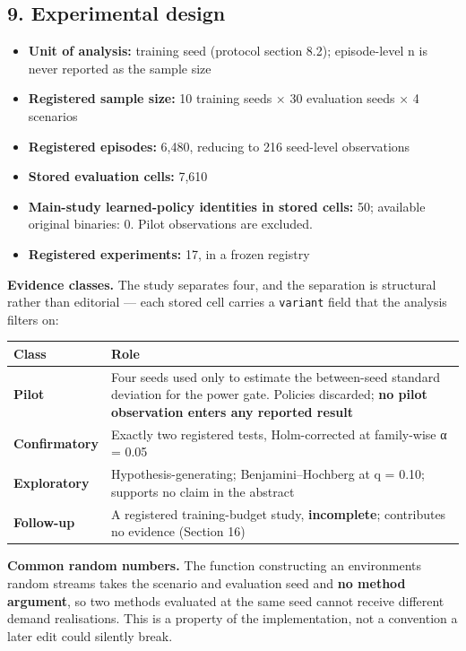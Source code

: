 \documentclass[
]{article}
\providecommand{\tightlist}{%
  \setlength{\itemsep}{0pt}\setlength{\parskip}{0pt}}
\begin{document}
\subsection{9. Experimental design}\label{9-experimental-design}

\begin{itemize}
\tightlist
\item
  \textbf{Unit of analysis:} training seed (protocol section 8.2);
  episode-level n is never reported as the sample size
\item
  \textbf{Registered sample size:} 10 training seeds × 30 evaluation
  seeds × 4 scenarios
\item
  \textbf{Registered episodes:} 6,480, reducing to 216 seed-level
  observations
\item
  \textbf{Stored evaluation cells:} 7,610
\item
  \textbf{Main-study learned-policy identities in stored cells:} 50;
  available original binaries: 0. Pilot observations are excluded.
\item
  \textbf{Registered experiments:} 17, in a frozen registry
\end{itemize}

\textbf{Evidence classes.} The study separates four, and the separation
is structural rather than editorial --- each stored cell carries a
\texttt{variant} field that the analysis filters on:

\begin{longtable}[]{@{}ll@{}}
\toprule\noalign{}
Class & Role \\
\midrule\noalign{}
\endhead
\bottomrule\noalign{}
\endlastfoot
\textbf{Pilot} & Four seeds used only to estimate the between-seed
standard deviation for the power gate. Policies discarded; \textbf{no
pilot observation enters any reported result} \\
\textbf{Confirmatory} & Exactly two registered tests, Holm-corrected at
family-wise α = 0.05 \\
\textbf{Exploratory} & Hypothesis-generating; Benjamini--Hochberg at q =
0.10; supports no claim in the abstract \\
\textbf{Follow-up} & A registered training-budget study,
\textbf{incomplete}; contributes no evidence (Section 16) \\
\end{longtable}

\textbf{Common random numbers.} The function constructing an
environment\textquotesingle s random streams takes the scenario and
evaluation seed and \textbf{no method argument}, so two methods
evaluated at the same seed cannot receive different demand realisations.
This is a property of the implementation, not a convention a later edit
could silently break.
\end{document}
